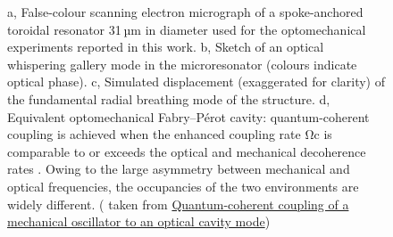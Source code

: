 \documentclass[
  a4paper,
]{book}
\begin{document}
\begin{tcolorbox}[enhanced jigsaw, coltitle=black, title=\textcolor{quarto-callout-note-color}{\faInfo}\hspace{0.5em}{Cooling of micro-mechnical oscillators}, colframe=quarto-callout-note-color-frame, toprule=.15mm, opacitybacktitle=0.6, left=2mm, opacityback=0, breakable, toptitle=1mm, bottomtitle=1mm, leftrule=.75mm, arc=.35mm, titlerule=0mm, colbacktitle=quarto-callout-note-color!10!white, rightrule=.15mm, bottomrule=.15mm, colback=white]

\begin{figure}[H]


\caption{\label{fig-mechanical}a, False-colour scanning electron
micrograph of a spoke-anchored toroidal resonator 31 µm in diameter used
for the optomechanical experiments reported in this work. b, Sketch of
an optical whispering gallery mode in the microresonator (colours
indicate optical phase). c, Simulated displacement (exaggerated for
clarity) of the fundamental radial breathing mode of the structure. d,
Equivalent optomechanical Fabry--Pérot cavity: quantum-coherent coupling
is achieved when the enhanced coupling rate Ωc is comparable to or
exceeds the optical and mechanical decoherence rates . Owing to the
large asymmetry between mechanical and optical frequencies, the
occupancies of the two environments are widely different. ( taken from
\href{https://www.nature.com/articles/nature10787}{Quantum-coherent
coupling of a mechanical oscillator to an optical cavity mode})}

\end{figure}%

\end{tcolorbox}
\end{document}
